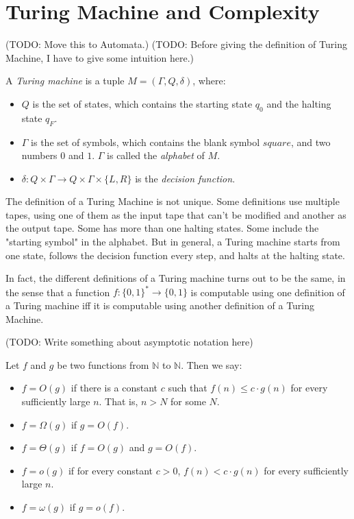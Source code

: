 

    \section{Turing Machine and Complexity}
        (TODO: Move this to Automata.) (TODO: Before giving the definition of Turing Machine, I have to give some intuition here.)
        \begin{defn} \label{def_tm}
            A \emph{Turing machine} is a tuple $M=(\Gamma,Q,\delta)$, where: \begin{itemize}
                \item $Q$ is the set of states, which contains the starting state $q_0$ and the halting state $q_F$.
                \item $\Gamma$ is the set of symbols, which contains the blank symbol $square$, and two numbers $0$ and $1$. $\Gamma$ is called the \emph{alphabet} of $M$.
                \item $\delta:Q \times \Gamma \rightarrow Q \times \Gamma \times \{L,R\}$ is the \emph{decision function}.
            \end{itemize}
        \end{defn}
        
        The definition of a Turing Machine is not unique. Some definitions use multiple tapes, using one of them as the input tape that can't be modified and another as the output tape. Some has more than one halting states. Some include the "starting symbol" in the alphabet. But in general, a Turing machine starts from one state, follows the decision function every step, and halts at the halting state.
        
        In fact, the different definitions of a Turing machine turns out to be the same, in the sense that a function $f:\{0,1\}^\ast \rightarrow \{0,1\}$ is computable using one definition of a Turing machine iff it is computable using another definition of a Turing Machine.
        
        (TODO: Write something about asymptotic notation here)
        
        \begin{defn} \label{def_bigo}
            Let $f$ and $g$ be two functions from $\mathbb{N}$ to $\mathbb{N}$. Then we say: \begin{itemize}
                \item $f=O(g)$ if there is a constant $c$ such that $f(n) \leq c \cdot g(n)$ for every sufficiently large $n$. That is, $n>N$ for some $N$.
                \item $f=\Omega(g)$ if $g=O(f)$.
                \item $f=\Theta(g)$ if $f=O(g)$ and $g=O(f)$.
                \item $f=o(g)$ if for every constant $c>0$, $f(n) < c \cdot g(n)$ for every sufficiently large $n$.
                \item $f=\omega(g)$ if $g=o(f)$.
            \end{itemize} 
        \end{defn}
        
